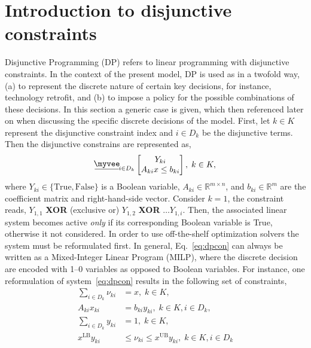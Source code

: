 \documentclass{amsart}
\newcommand{\myveebar}{\mathbin{\vcenter{\hbox{$ \underline{\mkern-2.4mu{\myvee}\mkern-2.4mu} $}}}}
\begin{document}
\section{Introduction to disjunctive constraints}\label{sec:DP}
%
Disjunctive Programming (DP) refers to linear programming with disjunctive
constraints. In the context of the present model, DP is used as in a twofold
way, (a) to represent the discrete nature of certain key decisions, for
instance, technology retrofit, and (b) to impose a policy for the possible
combinations of these decisions.  In this section a generic case is given, which
then referenced later on when discussing the specific discrete decisions of the
model. First, let $k\in K$ represent the disjunctive constraint index and $i\in
D_k$ be the disjunctive terms. Then the disjunctive constrains are represented
as,
%
\begin{equation}\label{eq:dpcon}
    \myveebar_{i \in D_k}
    \begin{bmatrix}
        Y_{ki} \\
        A_{ki} x \leq b_{ki}
    \end{bmatrix}, \; k\in K,
\end{equation}
%
where $Y_{ki}\in\{\text{True}, \text{False}\}$ is a Boolean variable, $A_{ki}\in
\mathbb{R}^{m\times n}$, and $b_{ki}\in \mathbb{R}^{m}$ are the coefficient
matrix and right-hand-side vector. Consider $k=1$, the constraint reads,
$Y_{1,1}$ \textbf{XOR} (exclusive or) $Y_{1,2}$ \textbf{XOR} $\dots Y_{1,i}$. 
Then, the associated linear system becomes active \emph{only} if its
corresponding Boolean variable is True, otherwise it not considered.
%
In order to use off-the-shelf optimization solvers the system must be
reformulated first. In general, Eq.~\eqref{eq:dpcon} can always be written as a
Mixed-Integer Linear Program (MILP), where the discrete decision are encoded
with 1--0 variables as opposed to Boolean variables.  For instance, one
reformulation of system~\eqref{eq:dpcon} results in the following set of
constraints,
%
\begin{equation}\label{eq:convex_hull}
    \begin{split}
        \sum_{i\in D_k} \nu_{ki} &= x, \; k\in K, \\
        A_{ki} x_{ki} &= b_{ki} y_{ki}, \; k\in K, i\in D_k, \\
        \sum_{i\in D_k} y_{ki} &= 1, \; k\in K, \\
        x^{\text{LB}}y_{ki} &\leq \nu_{ki} \leq x^{\text{UB}}y_{ki},
        \; k\in K, i\in D_k\\
    \end{split}
\end{equation}
\end{document}
